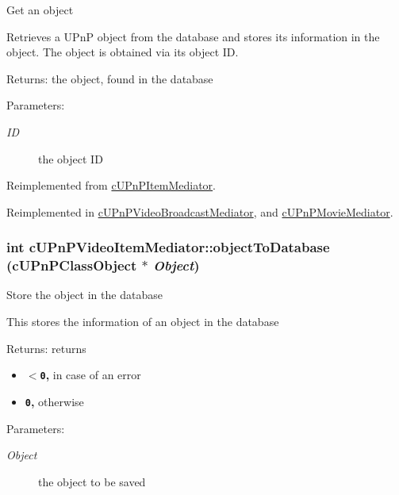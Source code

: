 Get an object

Retrieves a UPnP object from the database and stores its information in the object. The object is obtained via its object ID.

\begin{Desc}
\item[Returns:]the object, found in the database \end{Desc}
\begin{Desc}
\item[Parameters:]
\begin{description}
\item[{\em ID}]the object ID \end{description}
\end{Desc}
  

Reimplemented from \hyperlink{classcUPnPItemMediator_81411b2a472ade71d73a9c8ddc2a7990}{cUPnPItemMediator}.

Reimplemented in \hyperlink{classcUPnPVideoBroadcastMediator_c13bf0f008f49b0ab499542391998a24}{cUPnPVideoBroadcastMediator}, and \hyperlink{classcUPnPMovieMediator_d85b240eb54efd9ab46c440b51c71e83}{cUPnPMovieMediator}.\hypertarget{classcUPnPVideoItemMediator_984e10738bca46ce38307d5f60e26bd3}{
\subsubsection[{objectToDatabase}]{\setlength{\rightskip}{0pt plus 5cm}int cUPnPVideoItemMediator::objectToDatabase ({\bf cUPnPClassObject} $\ast$ {\em Object})}}
\label{classcUPnPVideoItemMediator_984e10738bca46ce38307d5f60e26bd3}


Store the object in the database

This stores the information of an object in the database

\begin{Desc}
\item[Returns:]returns\begin{itemize}
\item {\bf {\tt $<$0},} in case of an error\item {\bf {\tt 0},} otherwise \end{itemize}
\end{Desc}
\begin{Desc}
\item[Parameters:]
\begin{description}
\item[{\em Object}]the object to be saved \end{description}
\end{Desc}
 

